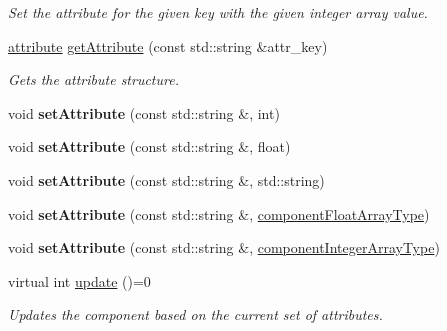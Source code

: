 \begin{DoxyCompactItemize}
\begin{DoxyCompactList}\small\item\em Set the attribute for the given key with the given integer array value. \end{DoxyCompactList}\item 
\hyperlink{_abstract_component_8h_a0eb4c6ea4bde1edbf1a86d0261e35706}{attribute} \hyperlink{class_abstract_component_aef199147690828f5f9b1c9b3ac3fa5f2}{get\-Attribute} (const std\-::string \&attr\-\_\-key)
\begin{DoxyCompactList}\small\item\em Gets the attribute structure. \end{DoxyCompactList}\item 
\hypertarget{class_abstract_component_a33abaccc7ba5ac6e6ca70b721e9358c4}{void {\bfseries set\-Attribute} (const std\-::string \&, int)}\label{d1/dae/class_abstract_component_a33abaccc7ba5ac6e6ca70b721e9358c4}

\item 
\hypertarget{class_abstract_component_a60c1eecf469128d698c1a638d639233f}{void {\bfseries set\-Attribute} (const std\-::string \&, float)}\label{d1/dae/class_abstract_component_a60c1eecf469128d698c1a638d639233f}

\item 
\hypertarget{class_abstract_component_af657681fc0d330b4df16c9df0d0c631b}{void {\bfseries set\-Attribute} (const std\-::string \&, std\-::string)}\label{d1/dae/class_abstract_component_af657681fc0d330b4df16c9df0d0c631b}

\item 
\hypertarget{class_abstract_component_a6e0c4430a642bf593939070a77a71119}{void {\bfseries set\-Attribute} (const std\-::string \&, \hyperlink{_abstract_component_8h_a55cf170262c3d7123f8b95208293e36d}{component\-Float\-Array\-Type})}\label{d1/dae/class_abstract_component_a6e0c4430a642bf593939070a77a71119}

\item 
\hypertarget{class_abstract_component_aa3eaa7fd9ee9ad045d04c1b2cda62edb}{void {\bfseries set\-Attribute} (const std\-::string \&, \hyperlink{_abstract_component_8h_a8bf1376a7e433919172c6631520f34b4}{component\-Integer\-Array\-Type})}\label{d1/dae/class_abstract_component_aa3eaa7fd9ee9ad045d04c1b2cda62edb}

\item 
virtual int \hyperlink{class_abstract_component_a35c9cab4e3845a947609b6ada8dc89cf}{update} ()=0
\begin{DoxyCompactList}\small\item\em Updates the component based on the current set of attributes. \end{DoxyCompactList}\end{DoxyCompactItemize}


